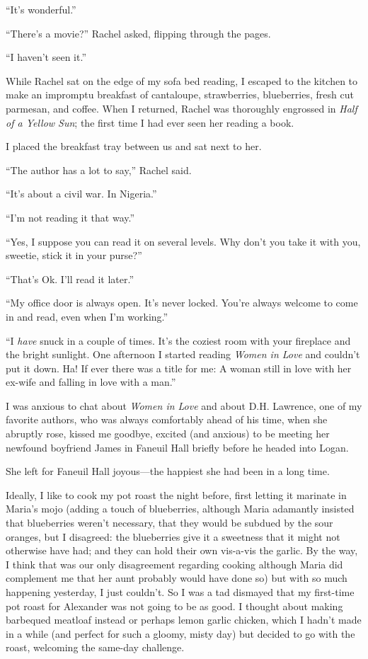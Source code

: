``It's wonderful.''

``There's a movie?'' Rachel asked, flipping through the pages.

``I haven't seen it.''

While Rachel sat on the edge of my sofa bed reading, I escaped to the
kitchen to make an impromptu breakfast of cantaloupe, strawberries,
blueberries, fresh cut parmesan, and coffee. When I returned, Rachel was
thoroughly engrossed in \emph{Half of a Yellow Sun}; the first time I
had ever seen her reading a book.

I placed the breakfast tray between us and sat next to her.

``The author has a lot to say,'' Rachel said.

``It's about a civil war. In Nigeria.''

``I'm not reading it that way.''

``Yes, I suppose you can read it on several levels. Why don't you take
it with you, sweetie, stick it in your purse?''

``That's Ok. I'll read it later.''

``My office door is always open. It's never locked. You're always
welcome to come in and read, even when I'm working.''

``I \emph{have} snuck in a couple of times. It's the coziest room with
your fireplace and the bright sunlight. One afternoon I started reading
\emph{Women in Love} and couldn't put it down. Ha! If ever there was a
title for me: A woman still in love with her ex-wife and falling in love
with a man.''

I was anxious to chat about \emph{Women in Love} and about D.H.
\linebreak Lawrence, one of my favorite authors, who was always comfortably ahead
of his time, when she abruptly rose, kissed me goodbye, excited (and
anxious) to be meeting her newfound boyfriend James in Faneuil Hall
briefly before he headed into Logan.

She left for Faneuil Hall joyous---the happiest she had been in a long
time.

Ideally, I like to cook my pot roast the night before, first letting it
marinate in Maria's mojo (adding a touch of blueberries, although Maria
adamantly insisted that blueberries weren't necessary, that they would
be subdued by the sour oranges, but I disagreed: the blueberries give it
a sweetness that it might not otherwise have had; and they can hold
their own vis-a-vis the garlic. By the way, I think that was our only
disagreement regarding cooking although Maria did complement me that her
aunt probably would have done so) but with so much happening yesterday,
I just couldn't. So I was a tad dismayed that my first-time pot roast
for Alexander was not going to be as good. I thought about making
barbequed meatloaf instead or perhaps lemon garlic chicken, which I
hadn't made in a while (and perfect for such a gloomy, misty day) but
decided to go with the roast, welcoming the same-day challenge.

